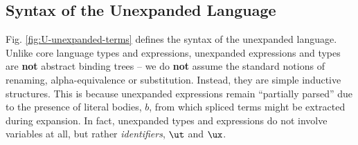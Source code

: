 \documentclass[acmsmall]{acmart}
\begin{document}
\subsection{Syntax of the Unexpanded Language}\label{sec:syntax-U}\label{sec:s-UL}
Fig. \ref{fig:U-unexpanded-terms} defines the syntax of the unexpanded language. Unlike core language types and expressions, unexpanded expressions and types are \textbf{not} abstract binding trees -- we do \textbf{not} assume the standard notions of renaming, alpha-equivalence or substitution. Instead, they are simple inductive  structures. This is because unexpanded expressions remain ``partially parsed'' due to the presence of literal bodies, $b$, from which spliced terms might be extracted during expansion. In fact, unexpanded types and expressions do not involve variables at all, but rather \emph{identifiers}, $\ut$ and $\ux$. %

\end{document}
